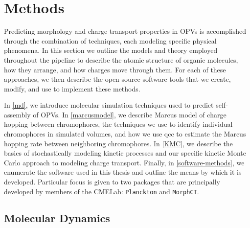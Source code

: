 \chapter{Methods}
\label{methods}

Predicting morphology and charge transport properties in OPVs is accomplished through the combination 
of techniques, each modeling specific physical phenomena.
In this section we outline the models and theory employed throughout the pipeline to describe 
the atomic structure of organic molecules, how they arrange, and how charges move through them. 
For each of these approaches, we then describe the open-source software tools that we create, modify, and use 
to implement these methods. 

In \autoref{md}, we introduce molecular simulation techniques used to predict self-assembly of OPVs.
In \autoref{marcusmodel}, we describe Marcus model of charge hopping between chromophores,
the techniques we use to identify individual chromophores in simulated volumes, 
and how we use \gls{qcc} to estimate the Marcus hopping rate between
neighboring chromophores.
In \autoref{KMC}, we describe the basics of stochastically modeling kinetic processes and 
our specific kinetic Monte Carlo approach to modeling charge transport.
Finally, in \autoref{software-methods}, we enumerate the software used in this thesis and outline the means by
which it is developed. Particular focus is given to two packages that are
principally developed by members of the CMELab:
\texttt{Planckton} and \texttt{MorphCT}.  
 

\section{Molecular Dynamics}

\label{md}

